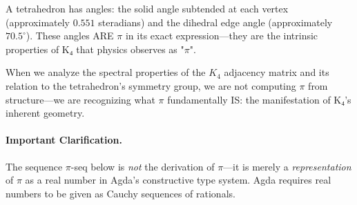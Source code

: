 \documentclass[11pt,a4paper]{book}
\begin{document}
\begin{center}
\end{center}

A tetrahedron has angles: the solid angle subtended at each vertex (approximately $0.551$ 
steradians) and the dihedral edge angle (approximately $70.5^\circ$). These angles ARE $\pi$ 
in its exact expression—they are the intrinsic properties of K₄ that physics observes as "$\pi$".

When we analyze the spectral properties of the $K_4$ adjacency matrix and its relation to the 
tetrahedron's symmetry group, we are not computing $\pi$ from structure—we are recognizing 
what $\pi$ fundamentally IS: the manifestation of K₄'s inherent geometry.

\paragraph{Important Clarification.}
The sequence $\pi$-seq below is \emph{not} the derivation of $\pi$—it is merely a 
\emph{representation} of $\pi$ as a real number in Agda's constructive type system.
Agda requires real numbers to be given as Cauchy sequences of rationals.
\end{document}
